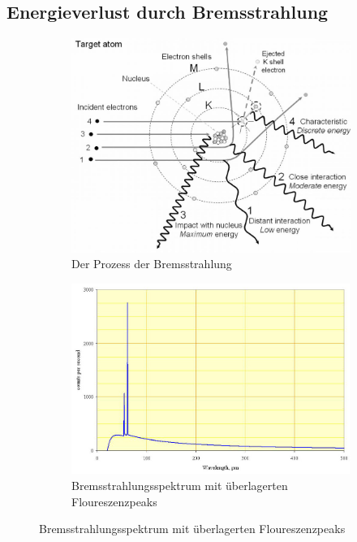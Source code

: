 \subsection{Energieverlust durch Bremsstrahlung}
\begin{figure}
	\centering
	\begin{subfigure}{0.4\textwidth}
		\centering
		\includegraphics[width=\textwidth]{./img/elatom.jpg}
		\caption{Der Prozess der Bremsstrahlung}
		\label{fig:elatom}
	\end{subfigure}
	\begin{subfigure}{0.4\textwidth}
		\centering
		\includegraphics[width=\textwidth]{./img/bremsspec.jpg}
		\caption{Bremsstrahlungsspektrum mit überlagerten Floureszenzpeaks}
		\label{fig:bremsspec}
	\end{subfigure}
\end{figure}

